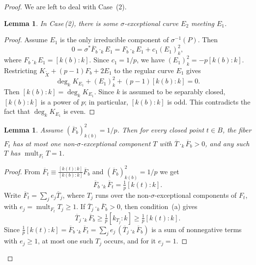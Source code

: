 \documentclass[reqno,oneside]{amsart}
\newtheorem{lemma}[theorem]{Lemma}
\theoremstyle{definition}
\theoremstyle{plain}
\numberwithin{equation}{section}
\begin{document}
\begin{proof}
We are left to deal with Case~(2).
\begin{lemma}\label{lemma-E2}
  In Case\,{\rm(2)}, there is some $\sigma$-exceptional curve $E_2$ meeting $E_1$.
\end{lemma}
\begin{proof}
  Assume $E_1$ is the only irreducible component of $\sigma^{-1}(P)$.
  Then \[
    0 = \sigma^*\overline F_b\cdot_k E_1 = F_b\cdot_{k} E_1+c_1(E_1)^2_{k}, 
  \]
  where $F_b \cdot_k E_1 = [k(b):k]$.
  Since $c_1=1/p$, we have $(E_1)^2_{k}=-p [k(b):k]$.
  Restricting $K_{\widetilde X} + (p-1) F_b + 2 E_1$ to the regular curve $E_1$ gives
\[
  \deg_{k} K_{E_1}+(E_1)^2_{k} + (p-1)[k(b):k]=0.
\]
  Then $[k(b):k] = \deg_{k} K_{E_1}$.
Since $k$ is assumed to be separably closed, $[k(b):k]$ is a power of $p$; in particular, $[k(b):k]$ is odd.
This contradicts the fact that $\deg_k K_{E_1}$ is even.
\end{proof}

\begin{lemma}\label{lemma-ob}
  Assume $(\overline{F}_b)^2_{k(b)}= 1/p$.
  Then for every closed point $t\in B$, the fiber $F_t$ has at most one non-$\sigma$-exceptional component $T$ with $\overline T\cdot_k\overline F_b>0$, and any such $T$ has $\operatorname{mult}_{F_t}T=1$.
\end{lemma}
\begin{proof}
  From $\overline F_t\equiv\tfrac{[k(t):k]}{[k(b):k]}\overline F_b$ and $(\overline F_b)^2_{k(b)}=1/p$ we get
  \[
    \overline F_b\cdot_k\overline F_t=\tfrac1p[k(t):k].
  \]
  Write $\overline F_t=\sum_j e_j\overline T_j$, where $T_j$ runs over the non-$\sigma$-exceptional components of $F_t$, with $e_j=\operatorname{mult}_{F_t}T_j\ge1$.
  If $\overline T_j\cdot_k\overline F_b>0$, then condition~{\rm(a)} gives
  \[
    \overline T_j\cdot_k\overline F_b\ge\tfrac1p[k_{T_j}:k]\ge\tfrac1p[k(t):k].
  \]
  Since $\tfrac1p[k(t):k]=\overline F_b\cdot_k\overline F_t=\sum_j e_j\,(\overline T_j\cdot_k\overline F_b)$ is a sum of nonnegative terms with $e_j\ge1$, at most one such $T_j$ occurs, and for it $e_j=1$.
\end{proof}


\end{proof}
\end{document}
